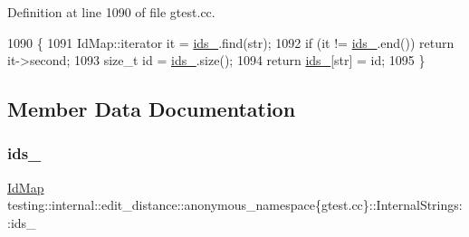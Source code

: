 Definition at line 1090 of file gtest.\+cc.


\begin{DoxyCode}
1090                                      \{
1091     IdMap::iterator it = \hyperlink{classtesting_1_1internal_1_1edit__distance_1_1anonymous__namespace_02gtest_8cc_03_1_1InternalStrings_a86d6b4db4bf034a8d2cc668df514d058}{ids\_}.find(str);
1092     \textcolor{keywordflow}{if} (it != \hyperlink{classtesting_1_1internal_1_1edit__distance_1_1anonymous__namespace_02gtest_8cc_03_1_1InternalStrings_a86d6b4db4bf034a8d2cc668df514d058}{ids\_}.end()) \textcolor{keywordflow}{return} it->second;
1093     \textcolor{keywordtype}{size\_t} \textcolor{keywordtype}{id} = \hyperlink{classtesting_1_1internal_1_1edit__distance_1_1anonymous__namespace_02gtest_8cc_03_1_1InternalStrings_a86d6b4db4bf034a8d2cc668df514d058}{ids\_}.size();
1094     \textcolor{keywordflow}{return} \hyperlink{classtesting_1_1internal_1_1edit__distance_1_1anonymous__namespace_02gtest_8cc_03_1_1InternalStrings_a86d6b4db4bf034a8d2cc668df514d058}{ids\_}[str] = id;
1095   \}
\end{DoxyCode}


\subsection{Member Data Documentation}
\mbox{\label{classtesting_1_1internal_1_1edit__distance_1_1anonymous__namespace_02gtest_8cc_03_1_1InternalStrings_a86d6b4db4bf034a8d2cc668df514d058}} 
\subsubsection{\texorpdfstring{ids\+\_\+}{ids\_}}
{\footnotesize\ttfamily \hyperlink{classtesting_1_1internal_1_1edit__distance_1_1anonymous__namespace_02gtest_8cc_03_1_1InternalStrings_a8c510fbc110525be4b4f9568da60d354}{Id\+Map} testing\+::internal\+::edit\+\_\+distance\+::anonymous\+\_\+namespace\{gtest.\+cc\}\+::Internal\+Strings\+::ids\+\_\+\hspace{0.3cm}{\ttfamily [private]}}




